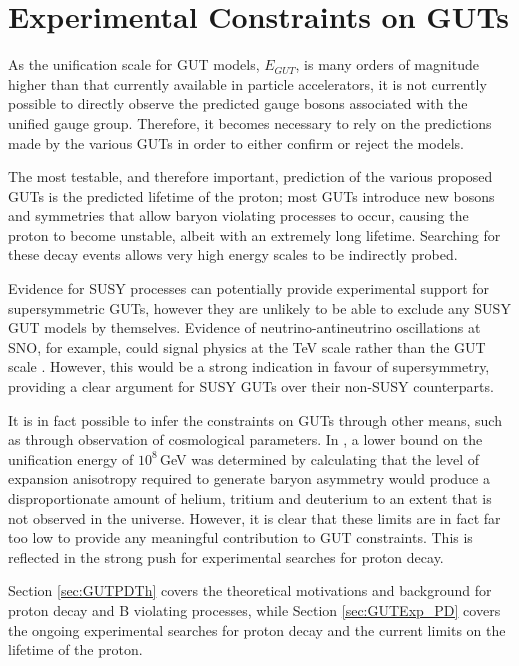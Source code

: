 \documentclass{article}
\begin{document}
\section{Experimental Constraints on GUTs}%
\label{sec:GUTExp}

As the unification scale for GUT models, $E_{GUT}$, is many orders of magnitude higher than that currently available in particle accelerators, it is not currently possible to directly observe the predicted gauge bosons associated with the unified gauge group. Therefore, it becomes necessary to rely on the predictions made by the various GUTs in order to either confirm or reject the models. 

The most testable, and therefore important, prediction of the various proposed GUTs is the predicted lifetime of the proton; most GUTs introduce new bosons and symmetries that allow baryon violating processes to occur, causing the proton to become unstable, albeit with an extremely long lifetime. Searching for these decay events allows very high energy scales to be indirectly probed.

Evidence for SUSY processes can potentially provide experimental support for supersymmetric GUTs, however they are unlikely to be able to exclude any SUSY GUT models by themselves. Evidence of neutrino-antineutrino oscillations at SNO, for example, could signal physics at the TeV scale rather than the GUT scale \cite{SUSYSU5MassRelations}. However, this would be a strong indication in favour of supersymmetry, providing a clear argument for SUSY GUTs over their non-SUSY counterparts.

It is in fact possible to infer the constraints on GUTs through other means, such as through observation of cosmological parameters. In \cite{CosmolGUTConstr}, a lower bound on the unification energy of $10^8\,$GeV was determined by calculating that the level of expansion anisotropy required to generate  baryon asymmetry would produce a disproportionate amount of helium, tritium and deuterium to an extent that is not observed in the universe. However, it is clear that these limits are in fact far too low to provide any meaningful contribution to GUT constraints. This is reflected in the strong push for experimental searches for proton decay.

Section \ref{sec:GUTPDTh} covers the theoretical motivations and background for proton decay and B violating processes, while Section \ref{sec:GUTExp_PD} covers the ongoing experimental searches for proton decay and the current limits on the lifetime of the proton.
\end{document}

